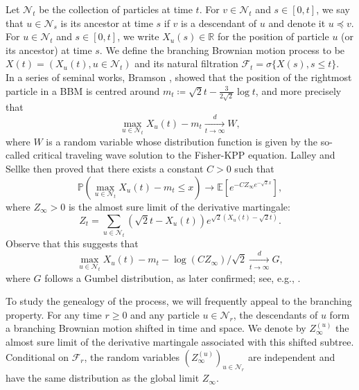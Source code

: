 \documentclass{article}
\newcommand{\E}[0]{\mathbb{E}}
\newcommand{\Prob}{\mathbb{P}}
\begin{document}
Let $\mathcal{N}_t$ be the collection of particles at time $t$. For $v \in \mathcal{N}_t$ and $s\in \left[0,t\right]$, we say that $u\in \mathcal{N}_s$ is its ancestor at time $s$ if $v$ is a descendant of $u$ and denote it $u\preceq v$. For $u\in \mathcal{N}_t$ and $s\in \left[0,t\right]$, we write $X_u(s) \in \mathbb{R}$  for the position of particle $u$ (or its ancestor) at time $s$. We define the branching Brownian motion process to be $X(t)=(X_u(t), u \in \mathcal{N}_t)$ and its natural filtration $\mathcal{F}_t=\sigma\{X(s), s\leq t \}$.\\ 





In a series of seminal works,  Bramson \cite{Bramson1983ConvergenceOS}, showed that the position of the rightmost particle in a BBM is centred around $m_t \coloneqq \sqrt 2 t -\frac3{2\sqrt 2 }\log t$, and more precisely that 
\[
\max_{u\in \mathcal{N}_t}X_u(t) - m_t \xrightarrow[t\rightarrow \infty]{d} W,
\]
where $W$ is a random variable whose distribution function is given by the so-called critical traveling wave solution to the Fisher-KPP equation. Lalley and Sellke \cite{Lalley1987ACL} then proved that  there exists a constant $C>0$ such that
\begin{equation}
     \Prob( \max_{u\in \mathcal{N}_t}X_u(t) - m_t\le x) \to \E\left[ e^{-C Z_\infty e^{-\sqrt 2 x}} \right],  
\end{equation} 
where  $Z_\infty>0$ is the almost sure limit of the derivative martingale:
\begin{equation*}
    Z_t=\sum_{u \in \mathcal{N}_t}(\sqrt{2}t - X_u(t))e^{\sqrt{2}(X_u(t)-\sqrt{2}t)}.
\end{equation*}
Observe that this suggests that
\begin{equation}
     \max_{u\in \mathcal{N}_t}X_u(t) - m_t -\log(CZ_\infty )/\sqrt{2}\xrightarrow[t\rightarrow \infty]{d} G,
\end{equation} 
where $G$ follows a Gumbel distribution, as later confirmed; see, e.g., \cite{adékon2012branching}.

To study the genealogy of the process, we will frequently appeal to the branching property. For any time $r \ge 0$ and any particle $u \in \mathcal{N}_r$, the descendants of $u$ form a branching Brownian motion shifted in time and space. We denote by $Z_\infty^{(u)}$ the almost sure limit of the derivative martingale associated with this shifted subtree. Conditional on $\mathcal{F}_r$, the random variables $(Z_\infty^{(u)})_{u \in \mathcal{N}_r}$ are independent and have the same distribution as the global limit $Z_\infty$.
\end{document}
